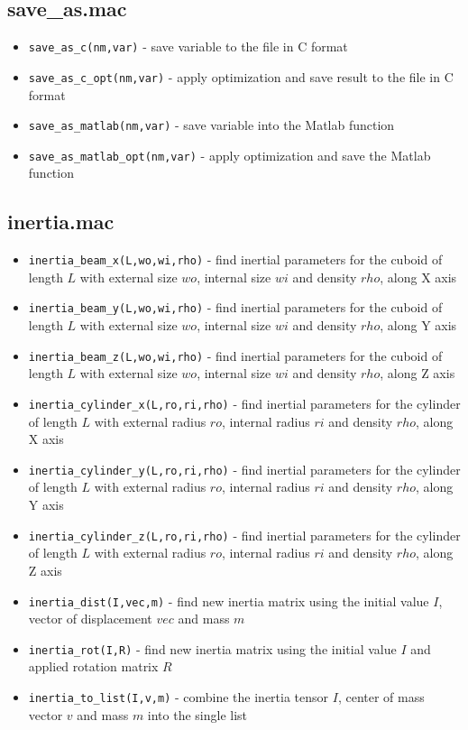 \documentclass{article}
\begin{document}
\subsection{save\_as.mac}

\begin{itemize}
    \item \texttt{save\_as\_c(nm,var)} - save variable to the file in C format 
    \item \texttt{save\_as\_c\_opt(nm,var)} - apply optimization and save result to the file in C format
    \item \texttt{save\_as\_matlab(nm,var)} - save variable into the Matlab function 
    \item \texttt{save\_as\_matlab\_opt(nm,var)} - apply optimization and save the Matlab function 
\end{itemize}

\subsection{inertia.mac} 

\begin{itemize}
    \item \texttt{inertia\_beam\_x(L,wo,wi,rho)} - find inertial parameters for the cuboid of length $L$ with external size $wo$, internal size $wi$ and density $rho$, along X axis
    \item \texttt{inertia\_beam\_y(L,wo,wi,rho)} - find inertial parameters for the cuboid of length $L$ with external size $wo$, internal size $wi$ and density $rho$, along Y axis
    \item \texttt{inertia\_beam\_z(L,wo,wi,rho)} - find inertial parameters for the cuboid of length $L$ with external size $wo$, internal size $wi$ and density $rho$, along Z axis
    \item \texttt{inertia\_cylinder\_x(L,ro,ri,rho)} - find inertial parameters for the cylinder of length $L$ with external radius $ro$, internal radius $ri$ and density $rho$, along X axis
    \item \texttt{inertia\_cylinder\_y(L,ro,ri,rho)} - find inertial parameters for the cylinder of length $L$ with external radius $ro$, internal radius $ri$ and density $rho$, along Y axis
    \item \texttt{inertia\_cylinder\_z(L,ro,ri,rho)} - find inertial parameters for the cylinder of length $L$ with external radius $ro$, internal radius $ri$ and density $rho$, along Z axis
    \item \texttt{inertia\_dist(I,vec,m)} - find new inertia matrix using the initial value $I$, vector of displacement $vec$ and mass $m$ 
    \item \texttt{inertia\_rot(I,R)} - find new inertia matrix using the initial value $I$ and applied rotation matrix $R$
    \item \texttt{inertia\_to\_list(I,v,m)} - combine the inertia tensor $I$, center of mass vector $v$ and mass $m$ into the single list
\end{itemize}
\end{document}
